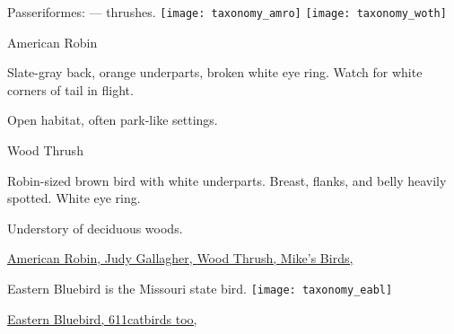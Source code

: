 \documentclass[t]{beamer}
\newcommand{\backoneline}{\vspace{-\baselineskip}}
\begin{document}
%

\begin{frame}{Passeriformes:  — thrushes.}
	\texttt{[image: taxonomy\_amro]}\hfill
	\texttt{[image: taxonomy\_woth]}
	
	\backoneline
	
	\begin{multicols}{2}
		American Robin
		
		\medskip
		
		Slate-gray back, orange underparts, broken white eye ring. Watch for white corners of tail in flight.
		
		\smallskip
		
		Open habitat, often park-like settings.
		\columnbreak
		
		Wood Thrush
		
		\medskip
		
		Robin-sized brown bird with white underparts. Breast, flanks, and belly heavily spotted. White eye ring.
		
		\smallskip
		
		Understory of deciduous woods.
		
	\end{multicols}	
	
	\vfilll
	
	\tiny
	
	\href{https://flickr.com/photos/52450054@N04/49910016428}{American Robin, Judy Gallagher, } \hfill 
	\href{https://flickr.com/photos/pazzani/40741868431}{Wood Thrush, Mike's Birds, }
	
	
\end{frame}

\begin{frame}{Eastern Bluebird is the Missouri state bird.}
	\texttt{[image: taxonomy\_eabl]}
	
	\tinyfill \href{https://flickr.com/photos/bhnuthatch611/49658803853}{Eastern Bluebird, 611catbirds too, }
	
\end{frame}



%
\end{document}
